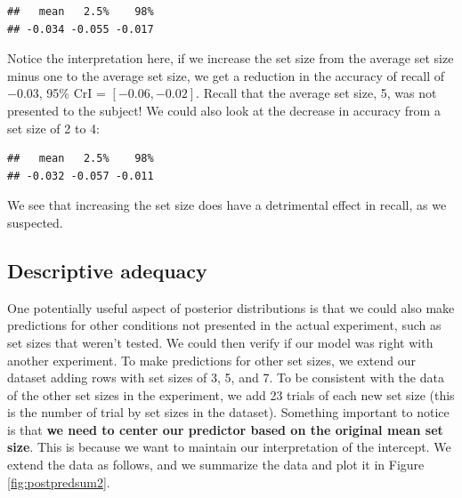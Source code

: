 \documentclass[12pt,]{krantz}
\newenvironment{Shaded}{\begin{snugshade}}{\end{snugshade}}
\newcommand{\DataTypeTok}[1]{\textcolor[rgb]{0.13,0.29,0.53}{#1}}
\newcommand{\DecValTok}[1]{\textcolor[rgb]{0.00,0.00,0.81}{#1}}
\newcommand{\KeywordTok}[1]{\textcolor[rgb]{0.13,0.29,0.53}{\textbf{#1}}}
\newcommand{\NormalTok}[1]{#1}
\newcommand{\OperatorTok}[1]{\textcolor[rgb]{0.81,0.36,0.00}{\textbf{#1}}}
\newcommand{\StringTok}[1]{\textcolor[rgb]{0.31,0.60,0.02}{#1}}
\theoremstyle{definition}
\theoremstyle{definition}
\theoremstyle{definition}
\theoremstyle{remark}
\begin{document}
\begin{verbatim}
##   mean   2.5%    98% 
## -0.034 -0.055 -0.017
\end{verbatim}

Notice the interpretation here, if we increase the set size from the average set size minus one to the average set size, we get a reduction in the accuracy of recall of \(-0.03\), 95\% CrI = \([ -0.06 , -0.02 ]\). Recall that the average set size, 5, was not presented to the subject! We could also look at the decrease in accuracy from a set size of 2 to 4:

\begin{Shaded}
\end{Shaded}

\begin{verbatim}
##   mean   2.5%    98% 
## -0.032 -0.057 -0.011
\end{verbatim}

We see that increasing the set size does have a detrimental effect in recall, as we suspected.

\hypertarget{descriptive-adequacy}{%
\subsection{Descriptive adequacy}\label{descriptive-adequacy}}

One potentially useful aspect of posterior distributions is that we could also make predictions for other conditions not presented in the actual experiment, such as set sizes that weren't tested. We could then verify if our model was right with another experiment. To make predictions for other set sizes, we extend our dataset adding rows with set sizes of 3, 5, and 7. To be consistent with the data of the other set sizes in the experiment, we add 23 trials of each new set size (this is the number of trial by set sizes in the dataset). Something important to notice is that \textbf{we need to center our predictor based on the original mean set size}. This is because we want to maintain our interpretation of the intercept. We extend the data as follows, and we summarize the data and plot it in Figure \ref{fig:postpredsum2}.
\end{document}
